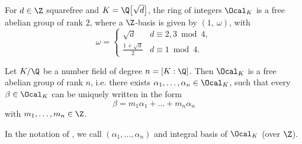 \begin{exmp*}
	For \( d \in \Z \) squarefree and \( K = \Q \big[\sqrt{d}\big] \), the ring of integers \( \Ocal_K \) is a free abelian group of rank \( 2 \), where a \( \Z \)-basis is given by \( (1,\ \omega) \), with
	\[ \omega = \begin{cases}
		\sqrt{d} &d \equiv 2,3 \bmod 4,\\
		\frac{1 + \sqrt{d}}{2} &d \equiv 1 \bmod 4.
	\end{cases} \]
\end{exmp*}

\begin{thmn}\label{thm:20}
	Let \( K/\Q \) be a number field of degree \( n = [K:\Q] \).
	Then \( \Ocal_K \) is a free abelian group of rank \( n \), i.e. there exists \( \alpha_1, \dotsc, \alpha_n \in \Ocal_K \), such that every \( \beta \in \Ocal_K \) can be uniquely written in the form
	\[ \beta = m_1 \alpha_1 + \dots + m_n \alpha_n \]
	with \( m_1, \dotsc, m_n \in \Z \).
\end{thmn}

\begin{rem*}
	In the notation of , we call \( (\alpha_1, \dotsc, \alpha_n) \) and integral basis of \( \Ocal_K \) (over \( \Z \)).
\end{rem*}